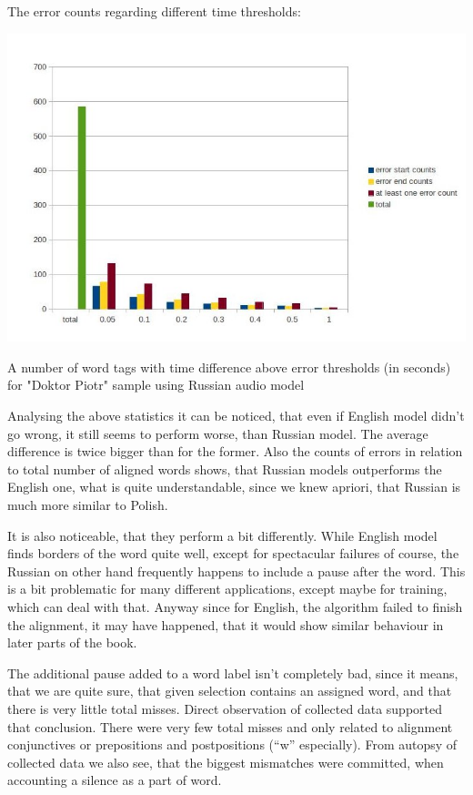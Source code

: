 \documentclass[12pt,a4paper,english]{article}
\begin{document}
The error counts regarding different time thresholds:
\begin{center}
    \includegraphics[scale=0.7]{doktor_piotr_word_russian_results.jpg}
    \caption[]{A number of word tags with time difference above error thresholds (in seconds) for "Doktor Piotr" sample using Russian audio model}
\end{center}

\newpage
Analysing the above statistics it can be noticed, that even if English model didn't go wrong, it still seems to perform worse, than Russian model. The average difference is twice bigger than for the former.  Also the counts of errors in relation to total number of aligned words shows, that Russian models outperforms the English one, what is quite understandable, since we knew apriori, that Russian is much more similar to Polish. \newline

It is also noticeable, that they perform a bit differently. While English model finds borders of the word quite well, except for spectacular failures of course, the Russian on other hand frequently happens to include a pause after the word. This is a bit problematic for many different applications, except maybe for training, which can deal with that. Anyway since for English, the algorithm failed to finish the alignment, it may have happened, that it would show similar behaviour in later parts of the book. \newline

The additional pause added to a word label isn't completely bad, since it means, that we are quite sure, that given selection contains an assigned word, and that there is very little total misses. Direct observation of collected data supported that conclusion. There were very few total misses and only related to alignment conjunctives or prepositions and postpositions (“w” especially).\newline
From autopsy of collected data we also see, that the biggest mismatches were committed, when accounting a silence as a part of word. \newline
\end{document}
